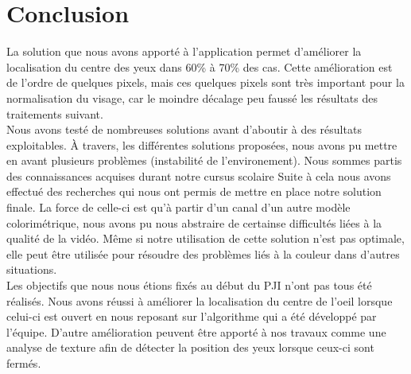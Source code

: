 \section{Conclusion}

La solution que nous avons apporté à l'application permet d'améliorer la localisation du centre des
yeux dans 60\% à 70\% des cas. Cette amélioration est de l'ordre de quelques pixels, mais ces quelques
pixels sont très important pour la normalisation du visage, car le moindre décalage peu faussé les 
résultats des traitements suivant.\\

Nous avons testé de nombreuses solutions avant d'aboutir à des résultats exploitables. À travers, les différentes 
solutions proposées, nous avons pu mettre en avant plusieurs problèmes (instabilité de l'environement).
Nous sommes partis des connaissances acquises durant notre cursus scolaire 
Suite à cela nous avons effectué des recherches qui nous ont permis de mettre en place 
notre solution finale.
La force de celle-ci est qu'à partir d'un canal d'un autre modèle colorimétrique, nous avons pu 
nous abstraire de certainse difficultés liées à la qualité de la vidéo. Même si notre utilisation de cette
solution n'est pas optimale, elle peut être utilisée pour résoudre des problèmes liés à la couleur dans d'autres situations.\\

Les objectifs que nous nous étions fixés au début du PJI n'ont pas tous été réalisés. Nous avons réussi à
améliorer la localisation du centre de l'oeil lorsque celui-ci est ouvert en nous reposant sur 
l'algorithme qui a été développé par l'équipe. D'autre amélioration peuvent être apporté à nos travaux
comme une analyse de texture afin de détecter la position des yeux lorsque ceux-ci sont fermés.\\


